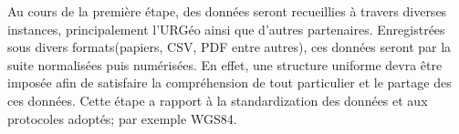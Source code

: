 \par
Au cours de la première étape, des données seront recueillies à 
travers diverses instances, principalement l'URGéo ainsi que d'autres partenaires. 
Enregistrées sous divers formats(papiers, CSV, PDF entre autres), 
ces données seront par la suite normalisées puis numérisées. En 
effet, une structure uniforme devra être imposée afin de satisfaire la 
compréhension de tout particulier et le partage des ces données.
Cette étape a rapport à la standardization des données et aux protocoles adoptés; par 
exemple WGS84.